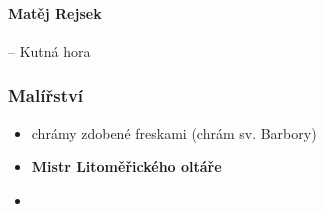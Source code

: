\paragraph{Matěj Rejsek} -- Kutná hora


\subsubsection{Malířství}
\begin{itemize}
\item chrámy zdobené freskami (chrám sv. Barbory)
\item \textbf{Mistr Litoměřického oltáře}
\end{itemize}

\begin{itemize}
\item[]
\end{itemize}

\timeline

